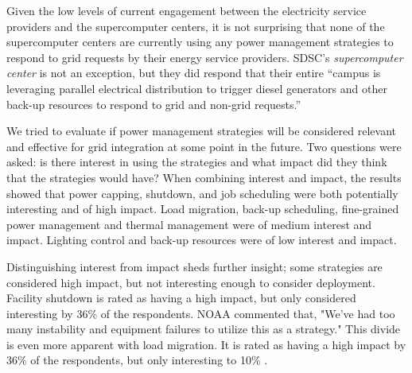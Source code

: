 Given the low levels of current engagement between the electricity service
providers and the supercomputer centers, it is not surprising that none of
the supercomputer centers are currently using any power management
strategies to respond to grid requests by their energy service
providers. SDSC's \textit{supercomputer center} is not an exception, but they did respond that their
entire ``campus is leveraging parallel electrical distribution to trigger
diesel generators and other back-up resources to respond to grid and
non-grid requests.''

We tried to evaluate if power management strategies will be considered
relevant and effective for grid integration at some point in the future. Two
questions were asked: is there interest in using the strategies and what
impact did they think that the strategies would have? When combining
interest and impact, the results showed that power capping, shutdown, and
job scheduling were both potentially interesting and of high impact. Load migration, back-up
scheduling, fine-grained power management and thermal management were of medium
interest and impact. Lighting control and back-up resources were of low
interest and impact.  

Distinguishing interest from impact sheds further insight; some strategies are 
considered high impact, but not interesting enough to consider deployment.  Facility
shutdown is rated as having a high impact, but only
considered interesting by 36\% of the respondents.  NOAA commented that, 
"We've had too many instability and equipment failures to utilize this as a strategy."  This divide is even more
apparent with load migration.  It is rated as having a high impact by 36\% of the
respondents, but only interesting to 10\% .  


